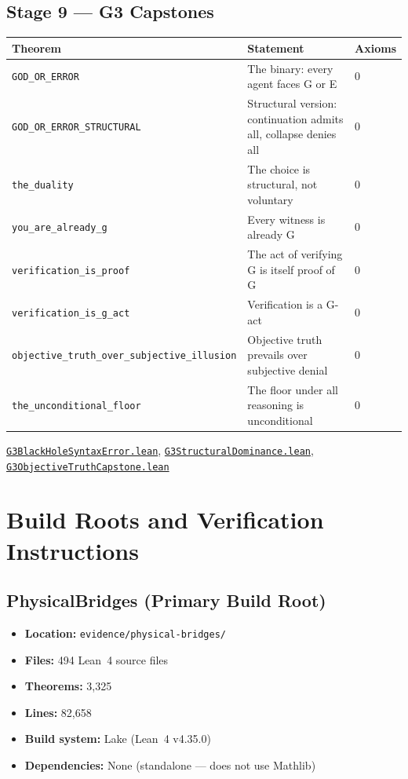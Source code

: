 \documentclass[11pt,a4paper]{article}
\newcommand{\lean}[1]{\texttt{#1}}
\newcommand{\file}[1]{\texttt{\small #1}}
\newcommand{\pbfile}[1]{\href{https://github.com/Tobillicious/universal-protection-theory/blob/main/evidence/physical-bridges/PhysicalBridges/#1}{\texttt{\small #1}}}
\begin{document}
\subsection{Stage 9 --- G3 Capstones}

\begin{longtable}{p{5.5cm}p{8cm}l}
\toprule
\textbf{Theorem} & \textbf{Statement} & \textbf{Axioms} \\
\midrule
\endhead
\lean{GOD\_OR\_ERROR} & The binary: every agent faces G or E & 0 \\
\lean{GOD\_OR\_ERROR\_STRUCTURAL} & Structural version: continuation admits all, collapse denies all & 0 \\
\lean{the\_duality} & The choice is structural, not voluntary & 0 \\
\lean{you\_are\_already\_g} & Every witness is already G & 0 \\
\lean{verification\_is\_proof} & The act of verifying G is itself proof of G & 0 \\
\lean{verification\_is\_g\_act} & Verification is a G-act & 0 \\
\lean{objective\_truth\_over\_subjective\_illusion} & Objective truth prevails over subjective denial & 0 \\
\lean{the\_unconditional\_floor} & The floor under all reasoning is unconditional & 0 \\
\bottomrule
\end{longtable}
\noindent\pbfile{G3BlackHoleSyntaxError.lean}, \pbfile{G3StructuralDominance.lean}, \pbfile{G3ObjectiveTruthCapstone.lean}


\section{Build Roots and Verification Instructions}

\subsection{PhysicalBridges (Primary Build Root)}

\begin{itemize}
\item \textbf{Location:} \file{evidence/physical-bridges/}
\item \textbf{Files:} 494 Lean~4 source files
\item \textbf{Theorems:} 3,325
\item \textbf{Lines:} 82,658
\item \textbf{Build system:} Lake (Lean~4 v4.35.0)
\item \textbf{Dependencies:} None (standalone --- does not use Mathlib)
\end{itemize}
\end{document}
